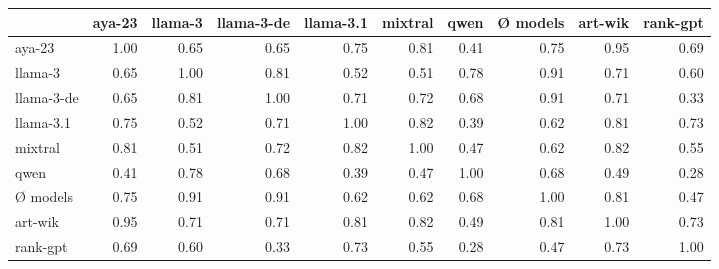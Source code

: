 \begin{tabular}{lrrrrrrrrr}
\toprule
 & aya-23 & llama-3 & llama-3-de & llama-3.1 & mixtral & qwen & Ø models & art-wik & rank-gpt \\
\midrule
aya-23 & 1.00 & 0.65 & 0.65 & 0.75 & 0.81 & 0.41 & 0.75 & 0.95 & 0.69 \\
llama-3 & 0.65 & 1.00 & 0.81 & 0.52 & 0.51 & 0.78 & 0.91 & 0.71 & 0.60 \\
llama-3-de & 0.65 & 0.81 & 1.00 & 0.71 & 0.72 & 0.68 & 0.91 & 0.71 & 0.33 \\
llama-3.1 & 0.75 & 0.52 & 0.71 & 1.00 & 0.82 & 0.39 & 0.62 & 0.81 & 0.73 \\
mixtral & 0.81 & 0.51 & 0.72 & 0.82 & 1.00 & 0.47 & 0.62 & 0.82 & 0.55 \\
qwen & 0.41 & 0.78 & 0.68 & 0.39 & 0.47 & 1.00 & 0.68 & 0.49 & 0.28 \\
Ø models & 0.75 & 0.91 & 0.91 & 0.62 & 0.62 & 0.68 & 1.00 & 0.81 & 0.47 \\
art-wik & 0.95 & 0.71 & 0.71 & 0.81 & 0.82 & 0.49 & 0.81 & 1.00 & 0.73 \\
rank-gpt & 0.69 & 0.60 & 0.33 & 0.73 & 0.55 & 0.28 & 0.47 & 0.73 & 1.00 \\
\bottomrule
\end{tabular}
